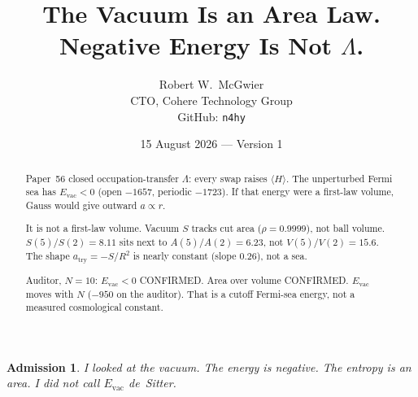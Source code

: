 \documentclass[11pt]{article}
\title{\textbf{The Vacuum Is an Area Law.\\
Negative Energy Is Not $\Lambda$.}}
\author{Robert W.\ McGwier\\
\small CTO, Cohere Technology Group\\
\small GitHub: \texttt{n4hy}}
\date{15 August 2026 --- Version 1}
\newtheorem*{admission}{Admission}
\begin{document}
\maketitle

\begin{abstract}
\noindent
Paper~56 closed occupation-transfer $\Lambda$: every
swap raises $\langle H\rangle$. The unperturbed Fermi
sea has $E_{\mathrm{vac}}<0$ (open $-1657$, periodic
$-1723$). If that energy were a first-law volume, Gauss
would give outward $a\propto r$.

It is not a first-law volume. Vacuum $S$ tracks cut
area ($\rho=0.9999$), not ball volume. $S(5)/S(2)=8.11$
sits next to $A(5)/A(2)=6.23$, not $V(5)/V(2)=15.6$.
The shape $a_{\mathrm{try}}=-S/R^2$ is nearly constant
(slope $0.26$), not a sea.

Auditor, $N=10$: $E_{\mathrm{vac}}<0$ CONFIRMED. Area
over volume CONFIRMED. $E_{\mathrm{vac}}$ moves with
$N$ ($-950$ on the auditor). That is a cutoff Fermi-sea
energy, not a measured cosmological constant.
\end{abstract}

\begin{admission}
I looked at the vacuum. The energy is negative. The
entropy is an area. I did not call $E_{\mathrm{vac}}$
de~Sitter.
\end{admission}
\end{document}
